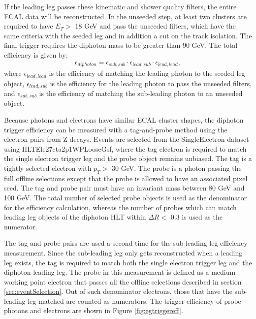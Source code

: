 \documentclass[thesis.tex]{subfiles}
\renewcommand\_{\textunderscore\allowbreak}
\begin{document}
If the leading leg passes these kinematic and shower quality filters, the entire ECAL data will be reconstructed. 
In the unseeded step, at least two clusters are required to have $E_T > $ 18 GeV and pass the unseeded filters, which have the same criteria with the seeded leg and in addition a cut on the track isolation. 
The final trigger requires the diphoton mass to be greater than 90 GeV. The total efficiency is given by:
\begin{eqnarray*}
	\epsilon_{diphoton} = \epsilon_{sub, sub} \cdot \epsilon_{lead, sub} \cdot \epsilon_{lead, lead},
\end{eqnarray*}
where $\epsilon_{lead, lead}$ is the efficiency of matching the leading photon to the seeded leg object, $\epsilon_{lead, sub}$ is the efficiency for the leading photon to pass the unseeded filters, and $ \epsilon_{sub, sub}$ is the efficiency of matching the sub-leading photon to an unseeded object. 

Because photons and electrons have similar ECAL cluster shapes, the diphoton trigger efficiency can be measured with a tag-and-probe method using the electron pairs from Z decays. 
Events are selected from the SingleElectron dataset using HLT\_Ele27\_eta2p1\_WPLoose\_Gsf, where the tag electron is required to match the single electron trigger leg and the probe object remains unbiased. 
The tag is a tightly selected electron with $p_T >$ 30 GeV.  
The probe is a photon passing the full offline selections except that the probe is allowed to have an associated pixel seed.
The tag and probe pair must have an invariant mass between 80 GeV and 100 GeV. 
The total number of selected probe objects is used as the denominator for the efficiency calculation, whereas the number of probes which can match leading leg objects of the diphoton HLT within $\Delta R <$ 0.3 is used as the numerator. 

The tag and probe pairs are used a second time for the sub-leading leg efficiency measurement. 
Since the sub-leading leg only gets reconstructed when a leading leg exists, the tag is required to match both the single electron trigger leg and the diphoton leading leg. 
The probe in this measurement is defined as a medium working point electron that passes all the offline selections described in section \ref{sec:eventSelection}. 
Out of such denominator electrons, those that have the sub-leading leg matched are counted as numerators. 
The trigger efficiency of probe photons and electrons are shown in Figure \ref{fig:egtriggereff}.
\end{document}
